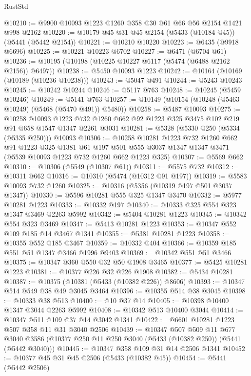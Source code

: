 \begin{lexlean}{RustStd}
\begin{coremodule}
@10210 := @9900 @10093 @1223 @1260 @358 @30 @61 @66 @56 @2154 @1421 @998 @2162
@10220 := @10179 @45 @31 @45 @2154 (@5433 (@10184 @45)) (@5441 (@5442 @2154))
@10221 := @10210 @10220
@10223 := @6435 (@9918 @6696)
@10225 := @10221 @10223 @6702
@10227 := @6471 (@6704 @61)
@10236 := @10195 (@10198 (@10225 @10227 @6117 (@5474 (@6488 @2162 @2156)) @6497))
@10238 := @5450 @10093 @1223
@10242 := @10164 (@10169 (@10189 (@10236 @10238)))
@10243 := @5047 @491
@10244 := @5243 @10243
@10245 := @10242 @10244
@10246 := @5117 @763
@10248 := @10245 (@5459 @10246)
@10249 := @5141 @763
@10257 := @10149 (@10154 (@10248 (@5463 @10249) (@5468 (@5470 @491)) @5480))
@10258 := @5487 @10093
@10275 := @10258
    @10093
    @1223
    @732
    @1260
    @662
    @92
    @1223
    @325
    @3475
    @102
    @219
    @91
    @658
    @1547
    @1347
    @2261
    @3031
@10281 := @5328 (@5330 @250 (@5334 (@5335 @250))) @10093
@10306 := @10258
    @10281
    @1223
    @732
    @1260
    @662
    @91
    @1223
    @325
    @1381
    @61
    @197
    @501
    @555
    @3037
    @1347
    @1347
    @3471
    (@5539 @10093 @1223 @732 @1260 @662 @1223 @325)
@10307 := @5569 @662
@10310 := @10306 (@5549 (@10307 @61))
@10311 := @5575 @732
@10312 := @10311 @662
@10316 := @10310 (@5474 (@10312 @91 @197))
@10319 := @5583 @10093 @732 @1260
@10325 := @10316 (@5356 (@10319 @197 @501 @3037 @1347))
@10330 := @5596 @10281 @555 @325 @1347 @3470
@10332 := @5977 @10281 @1223
@10333 := @10332 @197
@10340 := @10333 @325 @554 @323 @1347 @3469 @2263 @5992
@10342 := @5404 @10281 @1223
@10345 := @10342 @554 @323 @3469
@10347 := @5413 @10281 @1223
@10353 := @10347 @552 @109 @185 @14 @3467 @1341
@10355 := @5381 @10281 @1223
@10358 := @10355 @552 @185 @3467
@10359 := @10332 @404
@10366 := @10359 @185 @551 @51 @1347 @3466 @1996 @9403
@10369 := @10342 @551 @51 @3466
@10375 := @10347 @360 @550 @32 @50 @1908 @3465
@10377 := @5425 @10281 @1223
@10381 := @10377 @226 @32 @226 @1908
@10382 := @5434 @10281
@10387 := @10375 (@10381 (@5433 (@10382 @226)) @8606)
@10393 := @10347 @514 @549 @38 @49 @3045 @3464
@10396 := @10355 @514 @38 @3045
@10398 := @10333 @38 @513
@10400 := @10 @37 @14
@10405 := @10398 @10400 @1347 @3044 @2263 @5992
@10408 := @10342 @513 @10400 @3044
@10414 := @10347 @511 @109 @37 @14 @3042 @1341
@10422 := @6601 @10281 @1223 @507 @358 @11 @31 @3040 @2506
@10439 := @10347
    @507
    @509
    @11
    @677
    @3040
    @3586
    (@10377 @250 @11 @250 @3040 (@5433 (@10382 @250)) (@5441 (@5442 @3040)))
@10445 := @10347 @358 @109 @31 @14 @2506 @1341
@10452 := @10377 @45 @31 @45 @2506 (@5433 (@10382 @45))
@10454 := @5441 (@5442 @2506)

\end{coremodule}
\end{lexlean}
